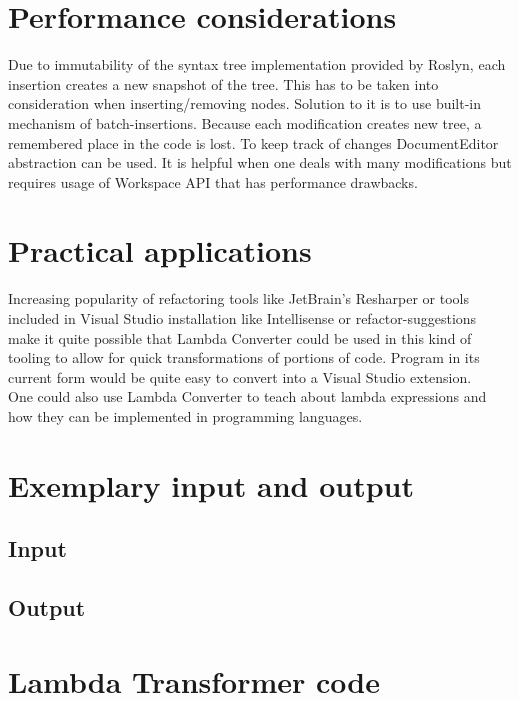 \documentclass[]{report}
\begin{document}
    
    \section{Performance considerations}
    Due to immutability of the syntax tree implementation provided by Roslyn, each insertion creates a new snapshot of the tree. This has to be taken into consideration when inserting/removing nodes. Solution to it is to use built-in mechanism of batch-insertions. Because each modification creates new tree, a remembered place in the code is lost. To keep track of changes DocumentEditor abstraction can be used. It is helpful when one deals with many modifications but requires usage of Workspace API that has performance drawbacks.
    
    \section{Practical applications}
    Increasing popularity of refactoring tools like JetBrain's Resharper or tools included in Visual Studio installation like Intellisense or refactor-suggestions make it quite possible that Lambda Converter could be used in this kind of tooling to allow for quick transformations of portions of code. Program in its current form would be quite easy to convert into a Visual Studio extension.
    \\
    One could also use Lambda Converter to teach about lambda expressions and how they can be implemented in programming languages. 


\section {Exemplary input and output}
    \subsection{Input}\label{testsInput}
    
    \pagebreak
    \subsection{Output}\label{testsOutput}
     
    \section{Lambda Transformer code}
\end{document}
